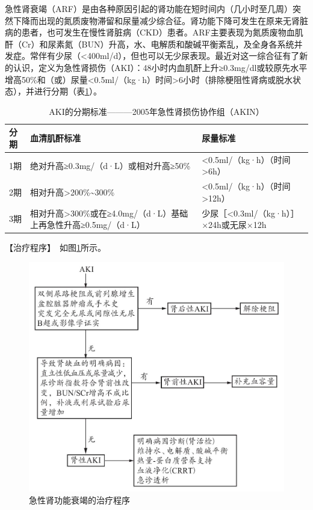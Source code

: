 急性肾衰竭（ARF）是由各种原因引起的肾功能在短时间内（几小时至几周）突然下降而出现的氮质废物滞留和尿量减少综合征。肾功能下降可发生在原来无肾脏病的患者，也可发生在慢性肾脏病（CKD）患者。ARF主要表现为氮质废物血肌酐（Cr）和尿素氮（BUN）升高，水、电解质和酸碱平衡紊乱，及全身各系统并发症。常伴有少尿（\textless{}400ml/d），但也可以无少尿表现。最近对这一综合征有了新的认识，定义为急性肾损伤（AKI）：48小时内血肌酐上升≥0.3mg/dl或较原先水平增高50\%和（或）尿量\textless{}0.5ml/（kg·h）时间\textgreater{}6小时（排除梗阻性肾病或脱水状态），并进行分期（表\ref{tab4-7-1}）。

\begin{table}[htbp]
    \centering
    \caption{AKI的分期标准---------2005年急性肾损伤协作组（AKIN）}
    \label{tab4-7-1}
    \begin{tabular}{lp{6.3cm}p{5cm}}
\toprule
分期 & 血清肌酐标准 & 尿量标准\tabularnewline
\midrule
\rowcolor{lightgray}1期 & 绝对升高≥0.3mg/（d·L）或相对升高≥50\% &
\textless{}0.5ml/（kg·h）（时间\textgreater{}6h）\tabularnewline
2期 & 相对升高\textgreater{}200\%\textasciitilde{}300\% &
\textless{}0.5ml/（kg·h）（时间\textgreater{}12h）\tabularnewline
\rowcolor{lightgray}3期 &
相对升高\textgreater{}300\%或在≥4.0mg/（d·L）基础上再急性升高≥0.5mg/（d·L）
& 少尿［\textless{}0.3ml/（kg·h）］×24h或无尿×12h\tabularnewline
\bottomrule
    \end{tabular}
\end{table}

【治疗程序】　如图\ref{fig4-7-1}所示。

\begin{figure}[!htbp]
 \centering
 \includegraphics{./images/Image00130.jpg}
 \captionsetup{justification=centering}
 \caption{急性肾功能衰竭的治疗程序}
 \label{fig4-7-1}
  \end{figure} 

